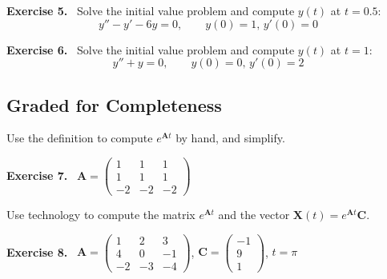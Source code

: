 \documentclass[12pt]{article}
\theoremstyle{definition}
\newcommand{\bA}{\mathbf{A}}
\newcommand{\bC}{\mathbf{C}}
\newcommand{\bX}{\mathbf{X}}
\newcommand{\exer}[1]{\noindent \textbf{Exercise #1.} \,}
\newcommand{\ds}{\displaystyle}
\begin{document}
\exer{5}  Solve the initial value problem and compute $y(t)$ at $t=0.5$:
	$$y'' - y' - 6 y = 0, \qquad y(0)=1, \, y'(0)=0$$

\exer{6}  Solve the initial value problem and compute $y(t)$ at $t=1$:
	$$y'' + y = 0, \qquad y(0)=0, \, y'(0)=2$$


\subsection*{Graded for Completeness}

Use the definition to compute $e^{\bA t}$ by hand, and simplify.

\exer{7}  $\ds \bA = \begin{pmatrix} 1 & 1 & 1 \\ 1 & 1 & 1 \\ -2 & -2 & -2 \end{pmatrix}$

\medskip
Use technology to compute the matrix $e^{\bA t}$ and the vector $\bX(t) = e^{\bA t} \bC$.

\exer{8}  $\ds \bA = \begin{pmatrix} 1 & 2 & 3 \\ 4 & 0 & -1 \\ -2 & -3 & -4 \end{pmatrix}$, $\ds \bC = \begin{pmatrix} -1 \\ 9 \\ 1 \end{pmatrix}$, $t=\pi$
\end{document}
